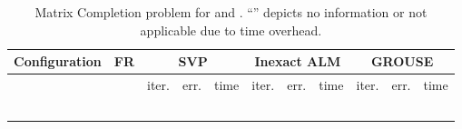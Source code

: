 \documentclass[twocolumn]{svjour3}
\begin{document}
\begin{table*} [!htp]
\caption{Matrix Completion problem for  and . ``'' depicts no information or not applicable due to time overhead.} {\label{table:3}}
\begin{center}
\begin{tabular}{|c|c|c|c|c|c|c|c|c|c|c|c|c|c}
\multicolumn{4}{c|}{Configuration} & FR & \multicolumn{3}{|c|}{SVP} & \multicolumn{3}{|c|}{Inexact ALM} & \multicolumn{3}{|c}{GROUSE} \\
\hline \hline
\multicolumn{1}{c}{}  & \multicolumn{1}{c}{} & \multicolumn{1}{c}{} & \multicolumn{1}{c|}{} & & 
\multicolumn{1}{|c}{\rm{iter.}} & \multicolumn{1}{c}{\rm{err.}} & \multicolumn{1}{c|}{\rm{time}} &
\multicolumn{1}{|c}{\rm{iter.}} & \multicolumn{1}{c}{\rm{err.}} & \multicolumn{1}{c|}{\rm{time}} &
\multicolumn{1}{|c}{\rm{iter.}} & \multicolumn{1}{c}{\rm{err.}} & \multicolumn{1}{c}{\rm{time}} \\
\hline\hline
\multicolumn{1}{c}{} & \multicolumn{1}{c}{} & \multicolumn{1}{c}{} & \multicolumn{1}{c|}{} &  & 
\multicolumn{1}{|c}{} & \multicolumn{1}{c}{} & \multicolumn{1}{c|}{} &
\multicolumn{1}{|c}{} & \multicolumn{1}{c}{} & \multicolumn{1}{c|}{} &
\multicolumn{1}{|c}{} & \multicolumn{1}{c}{} & \multicolumn{1}{c}{} \\
\hline
\multicolumn{1}{c}{} & \multicolumn{1}{c}{} & \multicolumn{1}{c}{} & \multicolumn{1}{c|}{} &  & 
\multicolumn{1}{|c}{} & \multicolumn{1}{c}{} & \multicolumn{1}{c|}{} &
\multicolumn{1}{|c}{} & \multicolumn{1}{c}{} & \multicolumn{1}{c|}{} &
\multicolumn{1}{|c}{} & \multicolumn{1}{c}{} & \multicolumn{1}{c}{} \\
\hline
\multicolumn{1}{c}{} & \multicolumn{1}{c}{} & \multicolumn{1}{c}{} & \multicolumn{1}{c|}{} &  & 
\multicolumn{1}{|c}{} & \multicolumn{1}{c}{} & \multicolumn{1}{c|}{} &
\multicolumn{1}{|c}{} & \multicolumn{1}{c}{} & \multicolumn{1}{c|}{} &
\multicolumn{1}{|c}{} & \multicolumn{1}{c}{} & \multicolumn{1}{c}{} \\
\hline
\multicolumn{1}{c}{} & \multicolumn{1}{c}{} & \multicolumn{1}{c}{} & \multicolumn{1}{c|}{} &  & 
\multicolumn{1}{|c}{} & \multicolumn{1}{c}{} & \multicolumn{1}{c|}{} &
\multicolumn{1}{|c}{} & \multicolumn{1}{c}{} & \multicolumn{1}{c|}{} &
\multicolumn{1}{|c}{} & \multicolumn{1}{c}{} & \multicolumn{1}{c}{} \\
\hline
\multicolumn{1}{c}{} & \multicolumn{1}{c}{} & \multicolumn{1}{c}{} & \multicolumn{1}{c|}{} &  & 
\multicolumn{1}{|c}{} & \multicolumn{1}{c}{} & \multicolumn{1}{c|}{} &
\multicolumn{1}{|c}{} & \multicolumn{1}{c}{} & \multicolumn{1}{c|}{} &

\end{tabular}
\end{center}
\end{table*}
\end{document}
